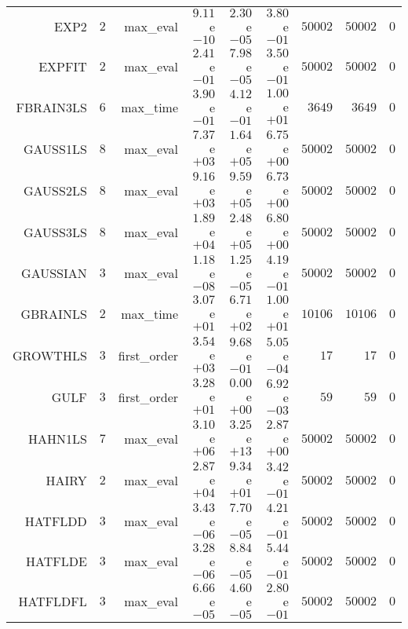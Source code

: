 \begin{longtable}{rrrrrrrrr}
EXP2 & \(     2\) & max\_eval & \( 9.11\)e\(-10\) & \( 2.30\)e\(-05\) & \( 3.80\)e\(-01\) & \( 50002\) & \( 50002\) & \(     0\) \\
EXPFIT & \(     2\) & max\_eval & \( 2.41\)e\(-01\) & \( 7.98\)e\(-05\) & \( 3.50\)e\(-01\) & \( 50002\) & \( 50002\) & \(     0\) \\
FBRAIN3LS & \(     6\) & max\_time & \( 3.90\)e\(-01\) & \( 4.12\)e\(-01\) & \( 1.00\)e\(+01\) & \(  3649\) & \(  3649\) & \(     0\) \\
GAUSS1LS & \(     8\) & max\_eval & \( 7.37\)e\(+03\) & \( 1.64\)e\(+05\) & \( 6.75\)e\(+00\) & \( 50002\) & \( 50002\) & \(     0\) \\
GAUSS2LS & \(     8\) & max\_eval & \( 9.16\)e\(+03\) & \( 9.59\)e\(+05\) & \( 6.73\)e\(+00\) & \( 50002\) & \( 50002\) & \(     0\) \\
GAUSS3LS & \(     8\) & max\_eval & \( 1.89\)e\(+04\) & \( 2.48\)e\(+05\) & \( 6.80\)e\(+00\) & \( 50002\) & \( 50002\) & \(     0\) \\
GAUSSIAN & \(     3\) & max\_eval & \( 1.18\)e\(-08\) & \( 1.25\)e\(-05\) & \( 4.19\)e\(-01\) & \( 50002\) & \( 50002\) & \(     0\) \\
GBRAINLS & \(     2\) & max\_time & \( 3.07\)e\(+01\) & \( 6.71\)e\(+02\) & \( 1.00\)e\(+01\) & \( 10106\) & \( 10106\) & \(     0\) \\
GROWTHLS & \(     3\) & first\_order & \( 3.54\)e\(+03\) & \( 9.68\)e\(-01\) & \( 5.05\)e\(-04\) & \(    17\) & \(    17\) & \(     0\) \\
GULF & \(     3\) & first\_order & \( 3.28\)e\(+01\) & \( 0.00\)e\(+00\) & \( 6.92\)e\(-03\) & \(    59\) & \(    59\) & \(     0\) \\
HAHN1LS & \(     7\) & max\_eval & \( 3.10\)e\(+06\) & \( 3.25\)e\(+13\) & \( 2.87\)e\(+00\) & \( 50002\) & \( 50002\) & \(     0\) \\
HAIRY & \(     2\) & max\_eval & \( 2.87\)e\(+04\) & \( 9.34\)e\(+01\) & \( 3.42\)e\(-01\) & \( 50002\) & \( 50002\) & \(     0\) \\
HATFLDD & \(     3\) & max\_eval & \( 3.43\)e\(-06\) & \( 7.70\)e\(-05\) & \( 4.21\)e\(-01\) & \( 50002\) & \( 50002\) & \(     0\) \\
HATFLDE & \(     3\) & max\_eval & \( 3.28\)e\(-06\) & \( 8.84\)e\(-05\) & \( 5.44\)e\(-01\) & \( 50002\) & \( 50002\) & \(     0\) \\
HATFLDFL & \(     3\) & max\_eval & \( 6.66\)e\(-05\) & \( 4.60\)e\(-05\) & \( 2.80\)e\(-01\) & \( 50002\) & \( 50002\) & \(     0\) \\

\end{longtable}
